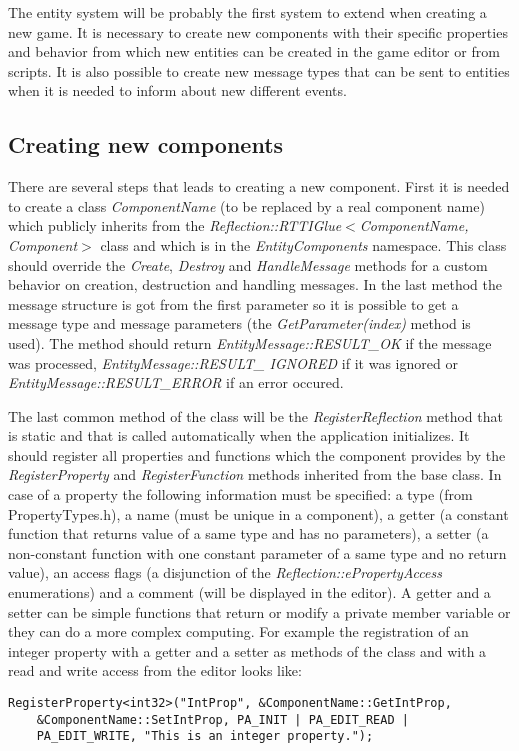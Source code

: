 The entity system will be probably the first system to extend when creating a new game. It is necessary to create new components with their specific properties and behavior from which new entities can be created in the game editor or from scripts. It is also possible to create new message types that can be sent to entities when it is needed to inform about new different events.

\subsection{Creating new components}
\label{sub:entity-newcomponents}

There are several steps that leads to creating a new component. First it is needed to create a class \emph{ComponentName} (to be replaced by a real component name) which publicly inherits from the \emph{Reflection::RTTIGlue$<$Component\-Name, Component$>$} class and which is in the \emph{EntityComponents} namespace. This class should override the \emph{Create}, \emph{Destroy} and \emph{HandleMessage} methods for a custom behavior on creation, destruction and handling messages. In the last method the message structure is got from the first parameter so it is possible to get a message type and message parameters (the \emph{GetParameter(index)} method is used). The method should return \emph{EntityMessage::RESULT\_OK} if the message was processed, \emph{EntityMessage::RESULT\_ IGNORED} if it was ignored or \emph{EntityMessage::RESULT\_ERROR} if an error occured.

The last common method of the class will be the \emph{RegisterReflection} me\-thod that is static and that is called automatically when the application initializes. It should register all properties and functions which the component provides by the \emph{RegisterProperty} and \emph{RegisterFunction} methods inherited from the base class. In case of a property the following information must be specified: a type (from PropertyTypes.h), a name (must be unique in a component), a getter (a constant function that returns value of a same type and has no parameters), a setter (a non-constant function with one constant parameter of a same type and no return value), an access flags (a disjunction of the \emph{Reflection::ePropertyAccess} enumerations) and a comment (will be displayed in the editor). A getter and a setter can be simple functions that return or modify a private member variable or they can do a more complex computing. For example the registration of an integer property with a getter and a setter as methods of the class and with a read and write access from the editor looks like:
\begin{verbatim}
RegisterProperty<int32>("IntProp", &ComponentName::GetIntProp,
    &ComponentName::SetIntProp, PA_INIT | PA_EDIT_READ |
    PA_EDIT_WRITE, "This is an integer property.");
\end{verbatim}

